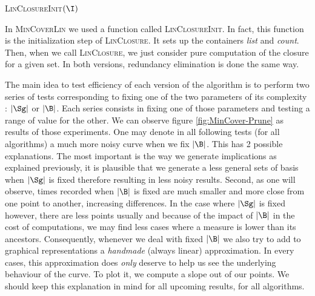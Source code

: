 \begin{algorithm}[H]
	
	\BlankLine
	\BlankLine
	
	\textsc{LinClosureInit}$(\I)$ \;
	
	
	\BlankLine
	

	
	\label{alg:MinCoverLin}
\end{algorithm}


\vspace{1.2em}

In \textsc{MinCoverLin} we used a function called \textsc{LinClosureInit}. In fact, this function is the initialization step of \textsc{LinClosure}. It sets up the containers \textit{list} and \textit{count}. Then, when we call \textsc{LinClosure}, we just consider pure computation of the closure for a given set. In both versions, redundancy elimination is done the same way.

\vspace{1.2em}

The main idea to test efficiency of each version of the algorithm is to perform
two series of tests corresponding to fixing one of the two parameters of its complexity : $|\Sg|$ or $|\B|$. Each series consists in fixing one of those parameters and testing a range of value for the other. We can observe figure
\ref{fig:MinCover-Prune} as results of those experiments. One may denote in all
following tests (for all algorithms) a much more noisy curve when we fix $|\B|$. This has 2 possible explanations. The most important is the way we generate implications as explained previously, it is plausible that we generate a less general sets of basis when $|\Sg|$ is fixed therefore resulting in less noisy results. Second, as one will observe, times recorded when $|\B|$ is fixed are much smaller and more close from one point to another, increasing differences. In the case where $|\Sg|$ is fixed however, there are less points usually and because of the impact of $|\B|$ in the cost of computations, we may
find less cases where a measure is lower than its ancestors. Consequently, whenever we deal with fixed $|\B|$ we also try to add to graphical representations a \textit{handmade} (always linear) approximation. In every cases, this approximation does \textit{only} deserve to help us see the underlying behaviour of the curve. To plot it, we compute a slope out of our points. We should keep this explanation in mind for all upcoming results, for all algorithms.


